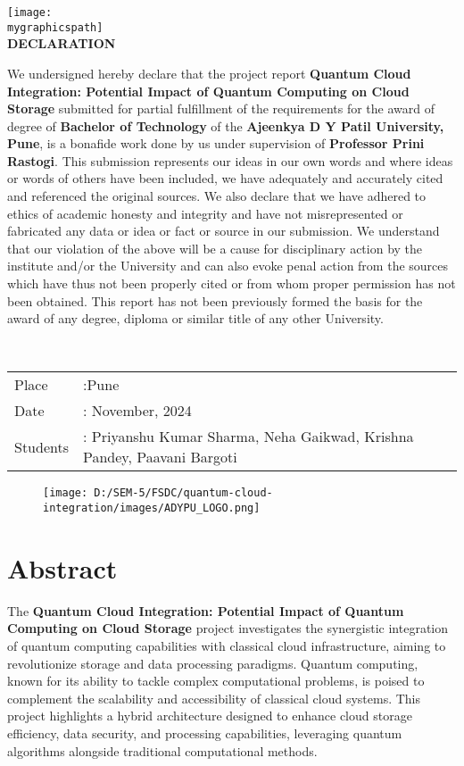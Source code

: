 \documentclass[12pt,a4paper]{article}
\newcommand{\mygraphicspath}{D:/SEM-5/FSDC/quantum-cloud-integration/images/ADYPU_LOGO.png}
\newcommand{\vname}{Priyanshu Kumar Sharma, Neha Gaikwad, Krishna Pandey, Paavani Bargoti}
\newcommand{\vdate}{November, 2024}
\newcommand{\vtitle}{Quantum Cloud Integration: Potential Impact of Quantum Computing on Cloud Storage}
\newcommand{\vguide}{Professor Prini Rastogi}
\begin{document}
\begin{center}
    \texttt{[image: \\mygraphicspath]}\\[2cm]
    \fontsize{14}{16}\selectfont \bfseries
    DECLARATION
    \end{center}
    We undersigned hereby declare that the project report 
    {\bfseries \vtitle} submitted for
    partial fulfillment of the requirements for the award of degree of \textbf{Bachelor of Technology} of
    the \textbf{Ajeenkya D Y Patil University, Pune}, is a bonafide work done by us
    under supervision of \textbf{\vguide}. This submission represents our ideas in
    our own words and where ideas or words of others have been included, we have adequately
    and accurately cited and referenced the original sources. We also declare that we have
    adhered to ethics of academic honesty and integrity and have not misrepresented or
    fabricated any data or idea or fact or source in our submission. We understand that our
    violation of the above will be a cause for disciplinary action by the institute and/or the
    University and can also evoke penal action from the sources which have thus not been
    properly cited or from whom proper permission has not been obtained. This report has
    not been previously formed the basis for the award of any degree, diploma or similar title
    of any other University. 
    
    \qquad\\[1cm]
    \begin{tabular}{llll}
    Place&:\enspace Pune\qquad  \\
    Date&: \vdate \\
    Students&: \vname
    \end{tabular}

\newpage



{\begin{figure}[!h]
    \centering
    \texttt{[image: D:/SEM-5/FSDC/quantum-cloud-integration/images/ADYPU\_LOGO.png]}
\end{figure}}

\section*{Abstract}

The \textbf{Quantum Cloud Integration: Potential Impact of Quantum Computing on Cloud Storage} project investigates the synergistic integration of quantum computing capabilities with classical cloud infrastructure, aiming to revolutionize storage and data processing paradigms. Quantum computing, known for its ability to tackle complex computational problems, is poised to complement the scalability and accessibility of classical cloud systems. This project highlights a hybrid architecture designed to enhance cloud storage efficiency, data security, and processing capabilities, leveraging quantum algorithms alongside traditional computational methods.  
\end{document}
